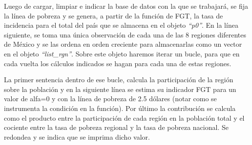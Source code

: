 \documentclass[
]{book}
\begin{document}
Luego de cargar, limpiar e indicar la base de datos con la que se trabajará, se fija la línea de pobreza y se genera, a partir de la función de FGT, la tasa de incidencia para el total del país que se almacena en el objeto \emph{``p0''}. En la línea siguiente, se toma una única observación de cada una de las 8 regiones diferentes de México y se las ordena en orden creciente para almacenarlas como un vector en el objeto \emph{``list\_rgn''}. Sobre este objeto haremos iterar un bucle, para que en cada vuelta los cálculos indicados se hagan para cada una de estas regiones.

La primer sentencia dentro de ese bucle, calcula la participación de la región sobre la población y en la siguiente línea se estima su indicador FGT para un valor de alfa=0 y con la línea de pobreza de 2.5 dólares (notar como se instrumenta la condición en la función). Por último la contribución se calcula como el producto entre la participación de cada región en la población total y el cociente entre la tasa de pobreza regional y la tasa de pobreza nacional. Se redondea y se indica que se imprima dicho valor.
\end{document}
